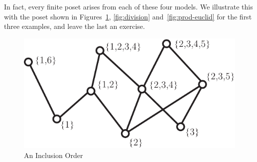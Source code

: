 % 
% 
% 

In fact, every finite poset arises from each of these four models.
We illustrate this with the poset shown in Figures~\ref{fig:inclusion},
\ref{fig:division} and~\ref{fig:prod-euclid} for the first three
examples, and leave the last an exercise.

\begin{figure}
\begin{center}
\includegraphics*[scale=.4]{posets-figs/wttfig-2}
\caption{An Inclusion Order}
\label{fig:inclusion}
\end{center}
\end{figure}

